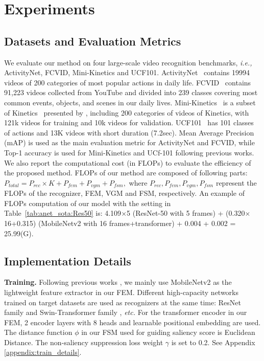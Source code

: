\documentclass[runningheads]{llncs}
\newcommand{\tabref}[1]{Table~\ref{#1}}
\begin{document}
\section{Experiments}
\subsection{Datasets and Evaluation Metrics}
We evaluate our method on four large-scale video recognition benchmarks, \emph{i.e.,} ActivityNet, FCVID, Mini-Kinetics and UCF101.
ActivityNet~\cite{caba2015activitynet} contains 19994 videos of 200 categories of most popular actions in daily life.
FCVID~\cite{fcvid} contains 91,223 videos collected from YouTube and divided into 239 classes covering most common events, objects, and scenes in our daily lives.
Mini-Kinetics~\cite{arnet} is a subset of Kinetics~\cite{kay2017kinetics} presented by \cite{arnet}, including 200 categories of videos of Kinetics, with 121k videos for training and 10k videos for validation.
UCF101~\cite{ucf101} has 101 classes of actions and 13K videos with short duration (7.2sec).
Mean Average Precision (mAP) is used as the main evaluation metric for ActivityNet and FCVID, while Top-1 accuracy is used for Mini-Kinetics and UCf-101 following previous works.  
We also report the computational cost (in FLOPs) to evaluate the efficiency of the proposed method. FLOPs of our method are composed of following parts:
$P_{total} = P_{rec} \times K + P_{fem}+P_{vgm}+P_{fsm},$
where $P_{rec}, P_{fem}, P_{vgm}, P_{fsm}$ represent the FLOPs of the 
recognizer, FEM, VGM and FSM, respectively. An example of FLOPs computation of our model with the setting in \tabref{tab:anet_sota:Res50} is: 4.109$\times$5 (ResNet-50 with 5 frames) + (0.320$\times$16+0.315) (MobileNetv2 with 16 frames+transformer) + 0.004 + 0.002 = 25.99(G).
\subsection{Implementation Details}\label{sec:details}
\textbf{Training.} 
Following previous works \cite{smart2020,adaframe}, we mainly use MobileNetv2 \cite{mobilenetv2} as the lightweight feature extractor in our FEM. Different high-capacity networks trained on target datasets are used as recognizers at the same time: ResNet family \cite{resnet} and Swin-Transformer family \cite{swintransformer}, \emph{etc.}
For the transformer encoder in our FEM, 2 encoder layers with 8 heads and learnable positional embedding are used.
The distance function $\phi$ in our FSM used for guiding saliency score is Euclidean Distance. The non-saliency suppression loss weight $\gamma$ 
is set to 0.2. 
See Appendix \ref{appendix:train_details}.
\end{document}
